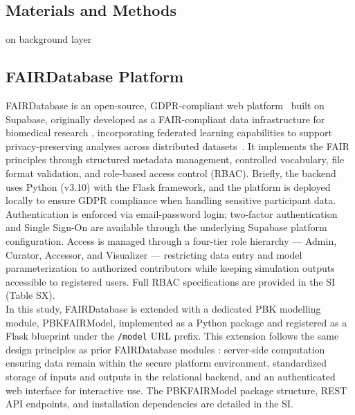 \documentclass[preprint,12pt]{elsarticle}
\begin{document}
\begin{linenumbers}
\section{Materials and Methods}\label{sec2}

on background layer%
\subsection{FAIRDatabase Platform} %
FAIRDatabase is an open-source, GDPR-compliant web platform~\citep{zhu2025fair} built on Supabase, originally developed as a FAIR-compliant data infrastructure for biomedical research \citep{dorst2024,vanEldijk2026}, incorporating federated learning capabilities to support privacy-preserving analyses across distributed datasets~\citep{de2026standardized,duah2025feddeepinsight}. It implements the FAIR principles \citep{rocca2023} through structured metadata management, controlled vocabulary, file format validation, and role-based access control (RBAC). Briefly, the backend uses Python (v3.10) with the Flask framework, and the platform is deployed locally to ensure GDPR compliance when handling sensitive participant data. Authentication is enforced via email-password login; two-factor authentication and Single Sign-On are available through the underlying Supabase platform configuration. Access is managed through a four-tier role hierarchy — Admin, Curator, Accessor, and Visualizer — restricting data entry and model parameterization to authorized contributors while keeping simulation outputs accessible to registered users. Full RBAC specifications are provided in the SI (Table SX).\\
In this study, FAIRDatabase is extended with a dedicated PBK modelling module, PBKFAIRModel, implemented as a Python package and registered as a Flask blueprint under the \texttt{/model} URL prefix. 
This extension follows the same design principles as prior FAIRDatabase modules \citep{vanEldijk2026}: server-side computation ensuring data remain within the secure platform environment, standardized storage of inputs and outputs in the relational backend, and an authenticated web interface for interactive use. The PBKFAIRModel package structure, REST API endpoints, and installation dependencies are detailed in the SI.





\end{linenumbers}
\end{document}
